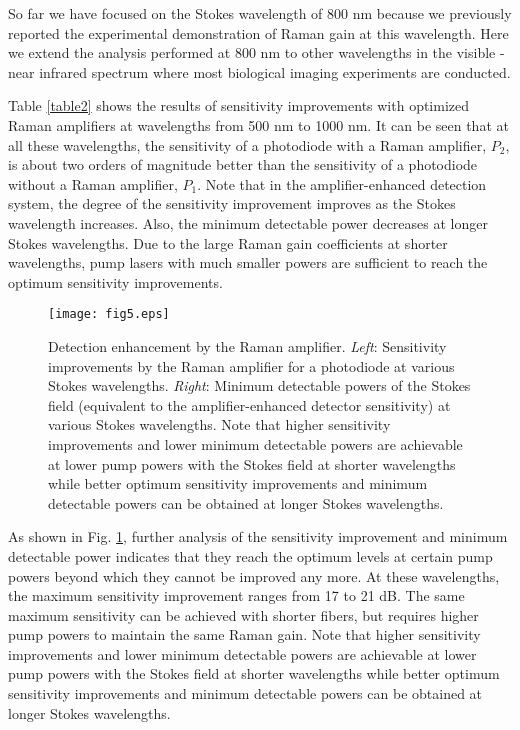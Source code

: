 \documentclass[10pt,letterpaper]{article}
\begin{document}
So far we have focused on the Stokes wavelength of 800 nm because we previously reported the experimental demonstration of Raman gain at this wavelength. Here we extend the analysis performed at 800 nm to other wavelengths in the visible - near infrared spectrum where most biological imaging experiments are conducted. 

Table \ref{table2} shows the results of sensitivity improvements with optimized Raman amplifiers at wavelengths from 500 nm to 1000 nm. It can be seen that at all these wavelengths, the sensitivity of a photodiode with a Raman amplifier, $P_2$, is about two orders of magnitude better than the sensitivity of a photodiode without a Raman amplifier, $P_1$. Note that in the amplifier-enhanced detection system, the degree of the sensitivity improvement improves as the Stokes wavelength increases. Also, the minimum detectable power decreases at longer Stokes wavelengths. Due to the large Raman gain coefficients at shorter wavelengths, pump lasers with much smaller powers are sufficient to reach the optimum sensitivity improvements. 

\begin{figure}[t]
\centering\texttt{[image: fig5.eps]}
\caption{Detection enhancement by the Raman amplifier. \textit{Left}: Sensitivity improvements by the Raman amplifier for a photodiode at various Stokes wavelengths. \textit{Right}: Minimum detectable powers of the Stokes field (equivalent to the amplifier-enhanced detector sensitivity) at various Stokes wavelengths. Note that higher sensitivity improvements and lower minimum detectable powers are achievable at lower pump powers with the Stokes field at shorter wavelengths while better optimum sensitivity improvements and minimum detectable powers can be obtained at longer Stokes wavelengths.}
\label{fig5}
\end{figure}

As shown in Fig. \ref{fig5}, further analysis of the sensitivity improvement and minimum detectable power indicates that they reach the optimum levels at certain pump powers beyond which they cannot be improved any more. At these wavelengths, the maximum sensitivity improvement ranges from 17 to 21 dB. The same maximum sensitivity can be achieved with shorter fibers, but requires higher pump powers to maintain the same Raman gain. Note that higher sensitivity improvements and lower minimum detectable powers are achievable at lower pump powers with the Stokes field at shorter wavelengths while better optimum sensitivity improvements and minimum detectable powers can be obtained at longer Stokes wavelengths.
\end{document}
